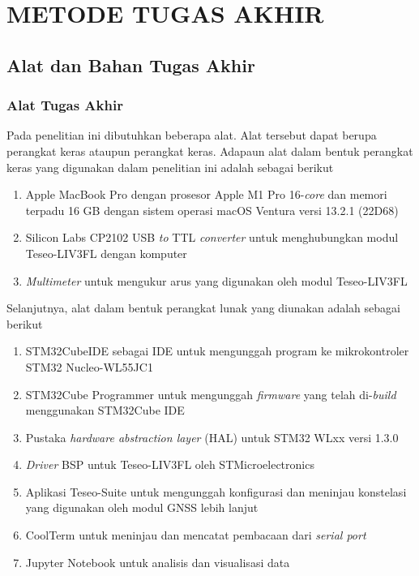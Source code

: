 \chapter{METODE TUGAS AKHIR}

\section{Alat dan Bahan Tugas Akhir}
\subsection{Alat Tugas Akhir}
Pada penelitian ini dibutuhkan beberapa alat. Alat tersebut dapat berupa perangkat keras ataupun perangkat keras. Adapaun alat dalam bentuk perangkat keras yang digunakan dalam penelitian ini adalah sebagai berikut
\begin{enumerate}
	\item Apple MacBook Pro dengan prosesor Apple M1 Pro 16-\textit{core} dan memori terpadu 16 GB dengan sistem operasi macOS Ventura versi 13.2.1 (22D68)
	\item Silicon Labs CP2102 USB \textit{to} TTL \textit{converter} untuk menghubungkan modul Teseo-LIV3FL dengan komputer
	\item \textit{Multimeter} untuk mengukur arus yang digunakan oleh modul Teseo-LIV3FL
\end{enumerate}
Selanjutnya, alat dalam bentuk perangkat lunak yang diunakan adalah sebagai berikut
\begin{enumerate}
	\item STM32CubeIDE sebagai IDE untuk mengunggah program ke mikrokontroler STM32 Nucleo-WL55JC1
	\item STM32Cube Programmer untuk mengunggah \textit{firmware} yang telah di-\textit{build} menggunakan STM32Cube IDE
	\item Pustaka \textit{hardware abstraction layer} (HAL) untuk STM32 WLxx versi 1.3.0
	\item \textit{Driver} BSP untuk Teseo-LIV3FL oleh STMicroelectronics
	\item Aplikasi Teseo-Suite untuk mengunggah konfigurasi dan meninjau konstelasi yang digunakan oleh modul GNSS lebih lanjut
	\item CoolTerm untuk meninjau dan mencatat pembacaan dari \textit{serial port}
	\item Jupyter Notebook untuk analisis dan visualisasi data
\end{enumerate}

